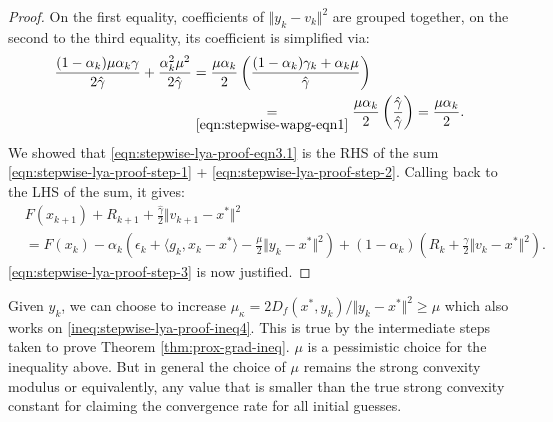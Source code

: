 \documentclass[12pt]{article}
\begin{document}
\begin{proof}
        On the first equality, coefficients of $\Vert y_k - v_k\Vert^2$ are grouped together, on the second to the third equality, its coefficient is simplified via: 
        \begin{align*}
            \frac{(1 - \alpha_k)\mu\alpha_k\gamma}{2\hat \gamma} + 
            \frac{\alpha_k^2 \mu^2}{2\hat \gamma}
            &= 
            \frac{\mu\alpha_k}{2}\left(
                \frac{(1 - \alpha_k)\gamma_k + \alpha_k \mu}{\hat \gamma}
            \right)
            \\
            &\underset{\eqref{eqn:stepwise-wapg-eqn1}}{=} \frac{\mu\alpha_k}{2}\left(
                \frac{\hat \gamma}{\hat \gamma}
            \right) = \frac{\mu\alpha_k}{2}. 
        \end{align*}
        We showed that \eqref{eqn:stepwise-lya-proof-eqn3.1} is the RHS of the sum \eqref{eqn:stepwise-lya-proof-step-1} + \eqref{eqn:stepwise-lya-proof-step-2}. 
        Calling back to the LHS of the sum, it gives: 
        \begin{align*}
            & F(x_{k + 1}) + R_{k + 1} + 
            \frac{\hat \gamma}{2}\Vert v_{k + 1} - x^*\Vert^2
            \\
            &= 
            F(x_k) - \alpha_k\left(
                \epsilon_k + \langle g_k, x_k - x^*\rangle
                - \frac{\mu}{2}\Vert y_k - x^*\Vert^2
            \right)
            + 
            (1 - \alpha_k)\left(
                R_k + \frac{\gamma}{2}\Vert v_k - x^*\Vert^2
            \right). 
        \end{align*}
        \eqref{eqn:stepwise-lya-proof-step-3} is now justified. 
        
    \end{proof}
    \begin{remark}
        Given $y_k$, we can choose to increase $\mu_\kappa = 2D_f(x^*, y_k)/\Vert y_k - x^*\Vert^2 \ge \mu$ which also works on \eqref{ineq:stepwise-lya-proof-ineq4}.
        This is true by the intermediate steps taken to prove Theorem \ref{thm:prox-grad-ineq}. 
        $\mu$ is a pessimistic choice for the inequality above. 
        But in general the choice of $\mu$ remains the strong convexity modulus or equivalently, any value that is smaller than the true strong convexity constant for claiming the convergence rate for all initial guesses. 
    \end{remark}
\end{document}
